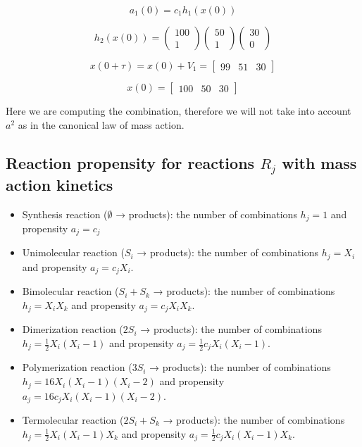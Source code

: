 $$a_1 (0) = c_1 h_1 (x(0))$$

$$h_2(x(0)) = \begin{pmatrix}100 \\ 1 \end{pmatrix}\begin{pmatrix}50 \\ 1 \end{pmatrix}\begin{pmatrix}30 \\ 0 \end{pmatrix}$$

$$x(0+ \tau) = x(0) + V_1 = \begin{bmatrix}99 &51& 30 \end{bmatrix}$$

$$x(0) = \begin{bmatrix}100 &50& 30 \end{bmatrix}$$

\noindent
Here we are computing the combination, therefore we will not take into account $a^2$ as in the canonical law of mass action.

\subsection{Reaction propensity for reactions $ R_j$ with mass action kinetics}

\begin{itemize}
  \item Synthesis reaction ($\emptyset$ → products): the number of combinations $ h_j = 1 $ and propensity $ a_j =c_j $
  \item Unimolecular reaction ($ S_i$ → products): the number of combinations $h_j= X_i$ and propensity $ a_j = c_jX_i $.
  \item Bimolecular reaction ($ S_i + S_k$ → products): the number of combinations $ h_j = X_iX_k$ and propensity $ a_j = c_jX_iX_k $.
  \item Dimerization reaction ($2S_i$ → products): the number of combinations $ h_j = \frac{1}{2}X_i(X_i -1) $ and propensity $ a_j = \frac{1}{2}c_jX_i(X_i -1) $.
  \item Polymerization reaction ($3S_i$ → products): the number of combinations $ h_j = 16X_i(X_i -1)(X_i -2)$ and propensity $ a_j = 16c_jX_i(X_i -1)(X_i -2) $.
  \item Termolecular reaction ($2S_i + S_k$ → products): the number of combinations $ h_j = \frac{1}{2}X_i(X_i -1)X_k$ and propensity $ a_j = \frac{1}{2}c_jX_i(X_i -1)X_k $.
\end{itemize}


